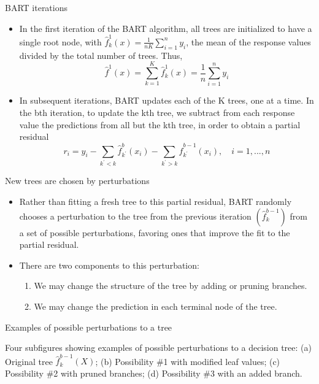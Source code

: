 \documentclass[aspectratio=169, 11pt]{beamer}
\begin{document}
\begin{frame}{BART iterations}
\begin{itemize}
    \item In the first iteration of the BART algorithm, all trees are initialized to have a single root node, with $\hat{f}_{k}^{1}(x)=\frac{1}{nK}\sum_{i=1}^{n}y_{i}$, the mean of the response values divided by the total number of trees. Thus,
    \begin{equation*}
    \hat{f}^{1}(x)=\sum_{k=1}^{K}\hat{f}_{k}^{1}(x)=\frac{1}{n}\sum_{i=1}^{n}y_{i}
    \end{equation*}
    \item In subsequent iterations, BART updates each of the K trees, one at a time. In the bth iteration, to update the kth tree, we subtract from each response value the predictions from all but the kth tree, in order to obtain a partial residual
    \begin{equation*}
    r_{i}=y_{i}-\sum_{k^{\prime}<k}\hat{f}_{k^{\prime}}^{b}(x_{i})-\sum_{k^{\prime}>k}\hat{f}_{k^{\prime}}^{b-1}(x_{i}), \quad i=1,...,n
    \end{equation*}
\end{itemize}
\end{frame}

\begin{frame}{New trees are chosen by perturbations}
\begin{itemize}
    \item Rather than fitting a fresh tree to this partial residual, BART randomly chooses a perturbation to the tree from the previous iteration $(\hat{f}_{k}^{b-1})$ from a set of possible perturbations, favoring ones that improve the fit to the partial residual.
    \item There are two components to this perturbation:
    \begin{enumerate}
        \item We may change the structure of the tree by adding or pruning branches.
        \item We may change the prediction in each terminal node of the tree.
    \end{enumerate}
\end{itemize}
\end{frame}

\begin{frame}{Examples of possible perturbations to a tree}
\begin{tcolorbox}[colback=LightGray,title=Figure]
Four subfigures showing examples of possible perturbations to a decision tree: (a) Original tree $\hat{f}_{k}^{b-1}(X)$; (b) Possibility \#1 with modified leaf values; (c) Possibility \#2 with pruned branches; (d) Possibility \#3 with an added branch.
\end{tcolorbox}
\end{frame}
\end{document}
